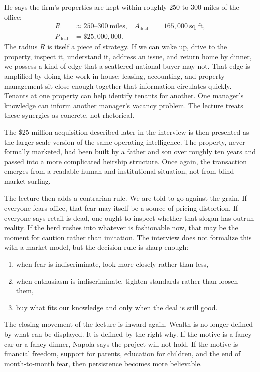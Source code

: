 He says the firm's properties are kept within roughly \(250\) to \(300\) miles of the office:
\begin{align}
R &\approx 250\text{--}300\ \text{miles}, &
A_{\text{deal}} &= 165{,}000\ \text{sq ft}, \\
P_{\text{deal}} &= \$25{,}000{,}000. &&
\end{align}
The radius \(R\) is itself a piece of strategy. If we can wake up, drive to the property, inspect it, understand it, address an issue, and return home by dinner, we possess a kind of edge that a scattered national buyer may not. That edge is amplified by doing the work in-house: leasing, accounting, and property management sit close enough together that information circulates quickly. Tenants at one property can help identify tenants for another. One manager's knowledge can inform another manager's vacancy problem. The lecture treats these synergies as concrete, not rhetorical.

The \$25 million acquisition described later in the interview is then presented as the larger-scale version of the same operating intelligence. The property, never formally marketed, had been built by a father and son over roughly ten years and passed into a more complicated heirship structure. Once again, the transaction emerges from a readable human and institutional situation, not from blind market surfing.

The lecture then adds a contrarian rule. We are told to go against the grain. If everyone fears office, that fear may itself be a source of pricing distortion. If everyone says retail is dead, one ought to inspect whether that slogan has outrun reality. If the herd rushes into whatever is fashionable now, that may be the moment for caution rather than imitation. The interview does not formalize this with a market model, but the decision rule is sharp enough:
\begin{enumerate}
\item when fear is indiscriminate, look more closely rather than less,
\item when enthusiasm is indiscriminate, tighten standards rather than loosen them,
\item buy what fits our knowledge and only when the deal is still good.
\end{enumerate}

The closing movement of the lecture is inward again. Wealth is no longer defined by what can be displayed. It is defined by the right why. If the motive is a fancy car or a fancy dinner, Napola says the project will not hold. If the motive is financial freedom, support for parents, education for children, and the end of month-to-month fear, then persistence becomes more believable.

